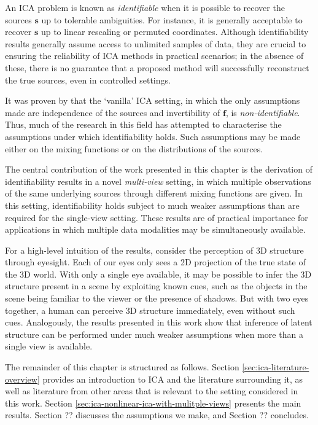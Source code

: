 An ICA problem is known as \emph{identifiable} when it is possible to recover the sources $\bm{s}$ up to tolerable ambiguities. 
For instance, it is generally acceptable to recover $\bm{s}$ up to linear rescaling or permuted coordinates.
Although identifiability results generally assume access to unlimited samples of data, they are crucial to ensuring the reliability of ICA methods in practical scenarios; in the absence of these, there is no guarantee that a proposed method will successfully reconstruct the true sources, even in controlled settings.

It was proven by \cite{hyvarinen1999nonlinear} that the `vanilla' ICA setting, in which the only assumptions made are independence of the sources and invertibility of $\bm{f}$, is \emph{non-identifiable}.
Thus, much of the research in this field has attempted to characterise the assumptions under which identifiability holds.
Such assumptions may be made either on the mixing functions or on the distributions of the sources. 

The central contribution of the work presented in this chapter is the derivation of identifiability results in a novel \emph{multi-view} setting, in which multiple observations of the same underlying sources through different mixing functions are given.
In this setting, identifiability holds subject to much weaker assumptions than are required for the single-view setting.
These results are of practical importance for applications in which multiple data modalities may be simultaneously available.

For a high-level intuition of the results, consider the perception of 3D structure through eyesight.
Each of our eyes only sees a 2D projection of the true state of the 3D world.
With only a single eye available, it may be possible to infer the 3D structure present in a scene by exploiting known cues, such as the objects in the scene being familiar to the viewer or the presence of shadows.
But with two eyes together, a human can perceive 3D structure immediately, even without such cues. 
Analogously, the results presented in this work show that inference of latent structure can be performed under much weaker assumptions when more than a single view is available.


The remainder of this chapter is structured as follows.
Section \ref{sec:ica-literature-overview} provides an introduction to ICA and the literature surrounding it, as well as literature from other areas that is relevant to the setting considered in this work.
Section \ref{sec:ica-nonlinear-ica-with-mulitple-views} presents the main results.
Section ?? discusses the assumptions we make, and Section ?? concludes.


